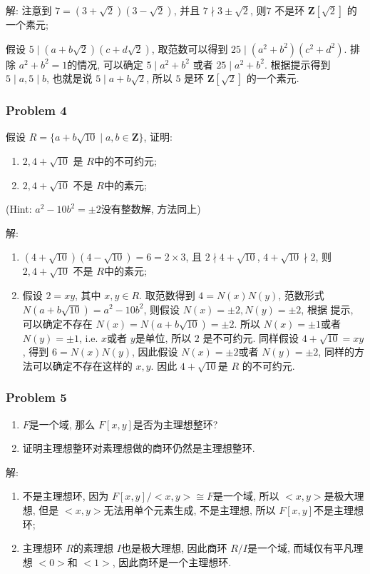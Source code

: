 \documentclass[a4paper,12pt]{ctexart}
\newcommand{\Z}{\mathbf{Z}}
\begin{document}
    解: 注意到 $ 7=(3+\sqrt{2})(3-\sqrt{2}) $, 并且 $ 7\nmid 3\pm\sqrt{2} $, 则$ 7 $ 不是环 $ \Z[\sqrt{2}] $ 的一个素元;

    假设 $ 5\mid (a+b\sqrt{2})(c+d\sqrt{2}) $, 取范数可以得到 $ 25\mid (a^2+b^2)(c^2+d^2) $. 排除 $ a^2+b^2=1 $的情况, 可以确定 $ 5\mid a^2+b^2 $
    或者 $ 25\mid a^2+b^2 $. 根据提示得到 $ 5\mid a,5\mid b $, 也就是说 $ 5\mid a+b\sqrt{2} $, 所以 $ 5 $ 是环 $ \Z[\sqrt{2}] $ 的一个素元.
\subsubsection*{Problem 4}
    假设 $ R=\{a+b\sqrt{10}\mid a,b\in\Z\} $, 证明:
    \begin{enumerate}
      \item $ 2, 4+\sqrt{10} $ 是 $ R $中的不可约元;
      \item $ 2, 4+\sqrt{10} $ 不是 $ R $中的素元;
    \end{enumerate}
    (Hint: $ a^2-10b^2=\pm 2 $没有整数解, 方法同上)

    解: \begin{enumerate}
      \item $ (4+\sqrt{10})(4-\sqrt{10})=6=2\times 3 $, 且 $ 2\nmid 4+\sqrt{10} $, $ 4+\sqrt{10}\nmid 2 $, 则 $ 2, 4+\sqrt{10} $ 不是 $ R $中的素元;
      \item 假设 $ 2=xy $, 其中 $ x,y\in R $. 取范数得到 $ 4=N(x)N(y) $, 范数形式  $ N(a+b\sqrt{10})=a^2-10b^2 $, 则假设 $ N(x)=\pm 2,N(y)=\pm 2 $, 根据
      提示, 可以确定不存在 $ N(x)=N(a+b\sqrt{10})=\pm 2 $. 所以 $ N(x)=\pm 1 $或者 $ N(y)=\pm 1 $, i.e. $ x $或者 $ y $是单位, 所以 $ 2 $ 是不可约元. 
      同样假设 $ 4+\sqrt{10}=xy $, 得到 $ 6=N(x)N(y) $, 因此假设 $ N(x)=\pm 2 $或者 $ N(y)=\pm 2 $, 同样的方法可以确定不存在这样的 $ x,y $. 因此 $ 4+\sqrt{10} $是 $ R $
      的不可约元. 
    \end{enumerate}
\subsubsection*{Problem 5}
    \begin{enumerate}
      \item $ F $是一个域, 那么 $ F[x,y] $是否为主理想整环?
      \item 证明主理想整环对素理想做的商环仍然是主理想整环.
    \end{enumerate}

    解:\begin{enumerate}
      \item 不是主理想环, 因为 $ F[x,y]/<x,y>\cong F $是一个域, 所以 $ <x,y> $是极大理想, 但是 $ <x,y> $无法用单个元素生成, 不是主理想, 所以 $ F[x,y] $不是主理想环;
      \item 主理想环 $ R $的素理想 $ I $也是极大理想, 因此商环 $ R/I $是一个域, 而域仅有平凡理想 $ <0> $和 $ <1> $, 因此商环是一个主理想环. 
    \end{enumerate}
\end{document}
